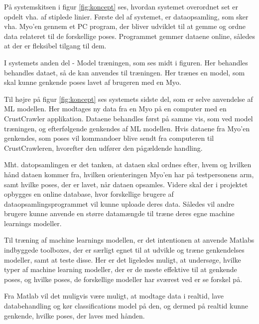 
På systemskitsen i figur \ref{fig:koncept} ses, hvordan systemet overordnet set er opdelt vha. af stiplede linier. Første del af systemet, er dataopsamling, som sker vha. Myo’en gennem et PC program, der bliver udviklet til at gemme og ordne data relateret til de forskellige poses. Programmet gemmer dataene online, således at der er fleksibel tilgang til dem.

I systemets anden del - Model træningen, som ses midt i figuren. Her behandles behandles dataet, så de kan anvendes til træningen. Her trænes en model, som skal kunne genkende poses lavet af brugeren med en Myo. 

Til højre på figur \ref{fig:koncept} ses systemets sidste del, som er selve anvendelse af ML modellen. Her modtages ny data fra en Myo på en computer med en CrustCrawler applikation. Dataene behandles først på samme vis, som ved model træningen, og efterfølgende genkendes af ML modellen. Hvis dataene fra Myo’en genkendes, som poses vil kommandoer blive sendt fra computeren til CrustCrawleren, hvorefter den udfører den pågældende handling.  

Mht. datopsamlingen er det tanken, at dataen skal ordnes efter, hvem og hvilken hånd dataen kommer fra, hvilken orienteringen Myo’en har på testpersonens arm, samt hvilke poses, der er lavet, når dataen opsamles. Videre skal der i projektet opbygges en online database, hvor forskellige brugere af dataopsamlingsprogrammet vil kunne uploade deres data. Således vil andre brugere kunne anvende en større datamængde til træne deres egne machine learnings modeller.

Til træning af machine learnings modellen, er det intentionen at anvende Matlabs indbyggede toolboxes, der er særligt egnet til at udvikle og træne genkendelses modeller, samt at teste disse. 
Her er det ligeledes muligt, at undersøge, hvilke typer af machine learning modeller, der er de meste effektive til at genkende poses, og hvilke poses, de forskellige modeller har sværest ved er se forskel på. 

Fra Matlab vil det muligvis være muligt, at modtage data i realtid, lave databehandling og kør classifications model på den, og dermed på realtid kunne genkende, hvilke poses, der laves med hånden.
